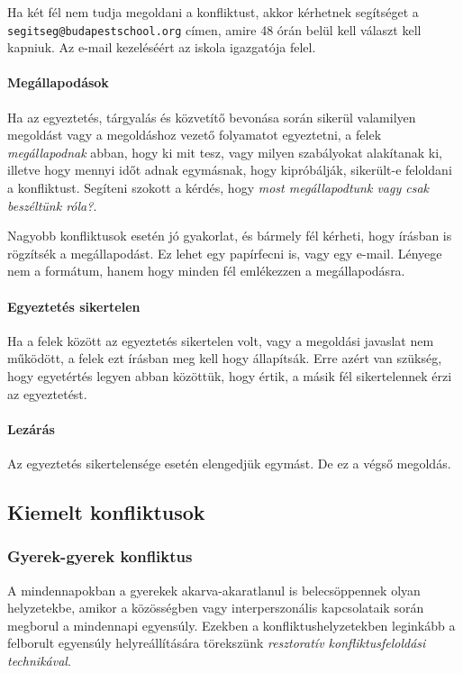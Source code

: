 Ha két fél nem tudja megoldani a konfliktust, akkor kérhetnek segítséget a \texttt{segitseg@budapestschool.org} címen, amire 48 órán belül kell választ kell kapniuk. Az e-mail kezeléséért az iskola igazgatója felel.

\paragraph{Megállapodások}

Ha az egyeztetés, tárgyalás és közvetítő bevonása során sikerül valamilyen megoldást vagy a megoldáshoz vezető folyamatot egyeztetni, a felek \emph{megállapodnak} abban, hogy ki mit tesz, vagy milyen szabályokat alakítanak ki, illetve hogy mennyi időt adnak egymásnak, hogy kipróbálják, sikerült-e feloldani a konfliktust. Segíteni szokott a kérdés, hogy \emph{most megállapodtunk vagy csak beszéltünk róla?}.

Nagyobb konfliktusok esetén jó gyakorlat, és bármely fél kérheti, hogy írásban is rögzítsék a megállapodást. Ez lehet egy papírfecni is, vagy egy e-mail. Lényege nem a formátum, hanem  hogy minden fél emlékezzen a megállapodásra.

\paragraph{Egyeztetés sikertelen}

Ha a felek között az egyeztetés sikertelen volt, vagy a megoldási javaslat nem működött, a felek ezt írásban meg kell hogy állapítsák. Erre azért van szükség, hogy egyetértés legyen abban közöttük, hogy értik, a másik fél sikertelennek érzi az egyeztetést.

\paragraph{Lezárás}

Az egyeztetés sikertelensége esetén elengedjük egymást. De ez a végső megoldás.

\subsection{Kiemelt konfliktusok}

\subsubsection{Gyerek-gyerek konfliktus}

A mindennapokban a gyerekek akarva-akaratlanul is
belecsöppennek\linebreak
olyan helyzetekbe, amikor a közösségben vagy interperszonális kapcsolataik során megborul a mindennapi egyensúly. Ezekben a konfliktushelyzetekben leginkább a felborult egyensúly helyreállítására törekszünk \emph{resztoratív konfliktusfeloldási technikával}.

